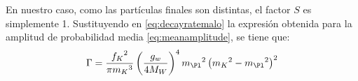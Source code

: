 En nuestro caso, como las partículas finales son distintas, el factor $S$ es simplemente 1. Sustituyendo en \ref{eq:decayratemalo} la expresión obtenida para la amplitud de probabilidad media \ref{eq:meanamplitude}, se tiene que:
\begin{equation}
\Gamma =\dfrac{{f_{K}}^{2}}{\pi {m_{K}}^{3}}\left( \dfrac{g_w}{4M_W}\right)^{4}{m_{\Pl}}^{2}\left({m_{K}}^{2}-{m_{\Pl}}^{2}\right)^{2}\label{eq:decayratebueno}
\end{equation}

